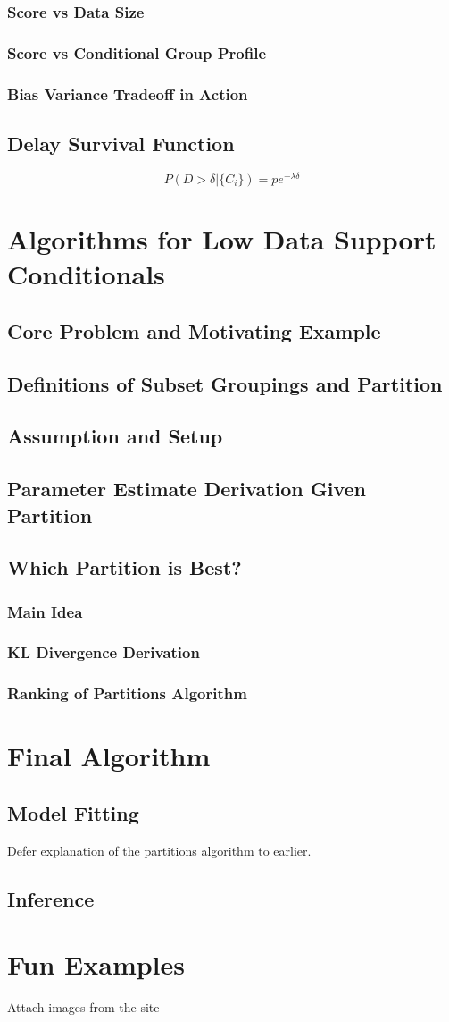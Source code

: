 \documentclass{article}
\begin{document}
\subsubsection{Score vs Data Size}
\subsubsection{Score vs Conditional Group Profile}
\subsubsection{Bias Variance Tradeoff in Action}

\subsection{Delay Survival Function}
$$P(D>\delta | \{C_i\}) = p e^{-\lambda \delta}$$

\section{Algorithms for Low Data Support Conditionals}
\subsection{Core Problem and Motivating Example}
\subsection{Definitions of Subset Groupings and Partition}
\subsection{Assumption and Setup}
\subsection{Parameter Estimate Derivation Given Partition}
\subsection{Which Partition is Best?}
\subsubsection{Main Idea}
\subsubsection{KL Divergence Derivation}
\subsubsection{Ranking of Partitions Algorithm}

\section{Final Algorithm}
\subsection{Model Fitting}
Defer explanation of the partitions algorithm to earlier.
\subsection{Inference}

\section{Fun Examples}
Attach images from the site
\end{document}
